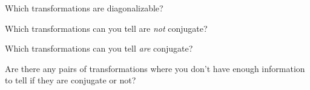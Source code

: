 \documentclass[14pt]{problemset}
\begin{document}
	\begin{parts}
		\item Which transformations are diagonalizable?
		\item Which transformations can you tell are \emph{not} conjugate?
		\item Which transformations can you tell \emph{are} conjugate?
		\item Are there any pairs of transformations where you don't have enough
			information to tell if they are conjugate or not?
	\end{parts}
\end{document}

